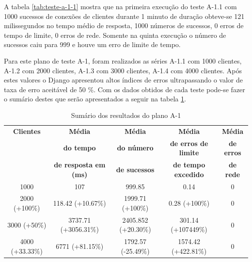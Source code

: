  A tabela \ref{tab:teste-a-1-1} mostra que na primeira execução do teste A-1.1 com 1000 sucessos de conexões de clientes
  durante 1 minuto de duração obteve-se 121 milissegundos no tempo médio de resposta,
  1000 números de sucessos, 0 erros de tempo de limite, 0 erros de rede. Somente na quinta execução o número de sucessos
  caiu para 999 e houve um erro de limite de tempo.

  Para este plano de teste A-1, foram realizados as séries A-1.1 com 1000 clientes, A-1.2 com 2000 clientes, A-1.3 com 3000 clientes,
  A-1.4 com 4000 clientes. Após estes valores o Django apresentou altos índices de erros ultrapassando o valor de taxa de erro
  aceitável de 50 \%. Com os dados obtidos de cada teste pode-se fazer o sumário
  destes que serão apresentados a seguir na tabela \ref{tab:sumario-resultado-plano-teste-a-1}.


  \begin{table}[H]
    \centering
    \footnotesize
    \setlength{\abovecaptionskip}{0pt}
    \setlength{\belowcaptionskip}{0pt}
    \caption[Sumário dos resultados do plano A-1]{Sumário dos resultados do plano A-1	}
    \label{tab:sumario-resultado-plano-teste-a-1}
    \begin{tabular}{c|c|c|c|c}
      \hline \hline
      \textbf{Clientes} & \textbf{Média} &	\textbf{Média} & \textbf{Média} & \textbf{Média}  \\
      {}		& \textbf{do tempo} &   \textbf{do número } & \textbf{de erros de limite} & \textbf{de erros}  \\
      {}		& \textbf{de resposta em (ms) } &\textbf{de sucessos } & \textbf{de tempo excedido} & \textbf{de rede} \\
      \hline \hline
      1000 &		107 &					999.85 & 			0.14 &					0 \\
      2000 (+100\%)&	118.42 (+10.67\%) &			1999.71 (+100\%)& 		0.28 (+100\%) &				0 \\
      3000 (+50\%)&	3737.71 (+3056.31\%)&			2405.852 (+20.30\%)& 		301.14 (+107449\%) &			0 \\
      4000 (+33.33\%)&	6771 (+81.15\%) &			1792.57 (-25.49\%)& 		1574.42 (+422.81\%) &			0 \\
      \hline \hline
    \end{tabular}
  \end{table}

